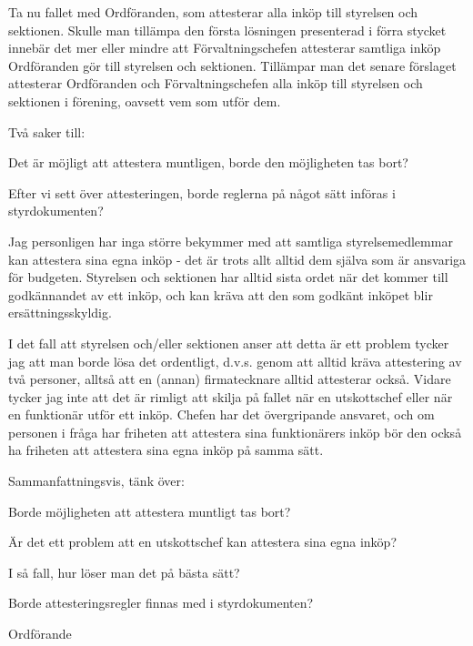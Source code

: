 \documentclass[10pt]{article}
\def\docauthor{Erik Månsson}
\begin{document}
\begin{paragrafer}
Ta nu fallet med Ordföranden, som attesterar alla inköp till styrelsen och sektionen. Skulle man tillämpa den första lösningen presenterad i förra stycket innebär det mer eller mindre att Förvaltningschefen attesterar samtliga inköp Ordföranden gör till styrelsen och sektionen. Tillämpar man det senare förslaget attesterar Ordföranden och Förvaltningschefen alla inköp till styrelsen och sektionen i förening, oavsett vem som utför dem.

Två saker till:
\begin{tightdashlist}
    \item Det är möjligt att attestera muntligen, borde den möjligheten tas bort?
    \item Efter vi sett över attesteringen, borde reglerna på något sätt införas i styrdokumenten?
\end{tightdashlist}

Jag personligen har inga större bekymmer med att samtliga styrelsemedlemmar kan attestera sina egna inköp - det är trots allt alltid dem själva som är ansvariga för budgeten. Styrelsen och sektionen har alltid sista ordet när det kommer till godkännandet av ett inköp, och kan kräva att den som godkänt inköpet blir ersättningsskyldig.

I det fall att styrelsen och/eller sektionen anser att detta är ett problem tycker jag att man borde lösa det ordentligt, d.v.s. genom att alltid kräva attestering av två personer, alltså att en (annan) firmatecknare alltid attesterar också. Vidare tycker jag inte att det är rimligt att skilja på fallet när en utskottschef eller när en funktionär utför ett inköp. Chefen har det övergripande ansvaret, och om personen i fråga har friheten att attestera sina funktionärers inköp bör den också ha friheten att attestera sina egna inköp på samma sätt.

\newpage

Sammanfattningsvis, tänk över:
\begin{tightdashlist}
    \item Borde möjligheten att attestera muntligt tas bort?
    \item Är det ett problem att en utskottschef kan attestera sina egna inköp?
    \item I så fall, hur löser man det på bästa sätt?
    \item Borde attesteringsregler finnas med i styrdokumenten?
\end{tightdashlist}


\end{paragrafer}

\begin{signatures}{1}
\ist
\signature{\docauthor}{Ordförande}
\end{signatures}
\end{document}

